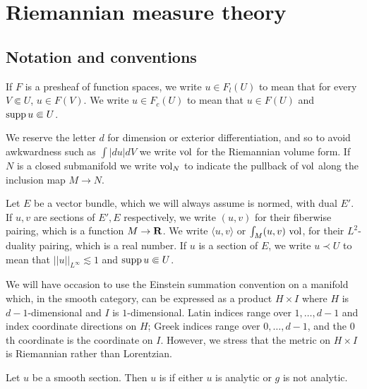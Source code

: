 \section{Riemannian measure theory}\label{RiemMeasureThy}
\subsection{Notation and conventions}
\begin{notation}[presheaves]
If $F$ is a presheaf of function spaces, we write $u \in F_l(U)$ to mean that for every $V \Subset U$, $u \in F(V)$.
We write $u \in F_c(U)$ to mean that $u \in F(U)$ and $\operatorname{supp} u \Subset U$.
\end{notation}

\begin{notation}
We reserve the letter $d$ for dimension or exterior differentiation, and so to avoid awkwardness such as $\int |du| dV$ we write $\mathrm{vol}$ for the Riemannian volume form.
If $N$ is a closed submanifold we write $\mathrm{vol}_N$ to indicate the pullback of $\mathrm{vol}$ along the inclusion map $M \to N$.
\end{notation}

\begin{notation}
Let $E$ be a vector bundle, which we will always assume is normed, with dual $E'$.
If $u,v$ are sections of $E',E$ respectively, we write $(u, v)$ for their fiberwise pairing, which is a function $M \to \mathbf{R}$.
We write $\langle u, v\rangle$ or $\int_M (u, v) ~\mathrm{vol}$, for their $L^2$-duality pairing, which is a real number.
If $u$ is a section of $E$, we write $u \prec U$ to mean that $||u||_{L^\infty} \lesssim 1$ and $\operatorname{supp} u \Subset U$.
\end{notation}

\begin{notation}\label{EinsteinNotation}
We will have occasion to use the Einstein summation convention on a manifold which, in the smooth category, can be expressed as a product $H \times I$ where $H$ is $d-1$-dimensional and $I$ is $1$-dimensional.
Latin indices range over $1, \dots, d - 1$ and index coordinate directions on $H$; Greek indices range over $0, \dots, d - 1$, and the $0$th coordinate is the coordinate on $I$.
However, we stress that the metric on $H \times I$ is Riemannian rather than Lorentzian.
\end{notation}

\begin{definition}
Let $u$ be a smooth section.
Then $u$ is  if either $u$ is analytic or $g$ is not analytic.
\end{definition}

